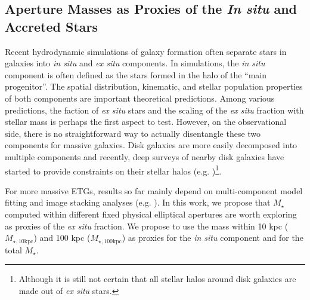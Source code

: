 \documentclass[a4paper,fleqn,usenatbib]{mnras}
\def\mstar{{$M_{\star}$}}
\def\minn{{$M_{\star,10\mathrm{kpc}}$}}
\def\mtot{{$M_{\star,100\mathrm{kpc}}$}}
\begin{document}
    

\subsection{Aperture Masses as Proxies of the \textit{In situ} and Accreted Stars}
    \label{ssec:insitu}
    
    Recent hydrodynamic simulations of galaxy formation often separate stars in 
    galaxies into \textit{in situ} and \textit{ex situ} components. 
    In simulations, the \textit{in situ} component is often defined as the stars 
    formed in the halo of the ``main progenitor''.  
    The spatial distribution, kinematic, and stellar population properties of both 
    components are important theoretical predictions. 
    Among various predictions, the faction of \textit{ex situ} stars and the scaling 
    of the \textit{ex situ} fraction with stellar mass is perhaps the first aspect to 
    test. 
    However, on the observational side, there is no straightforward way to actually
    disentangle these two components for massive galaxies. 
    Disk galaxies are more easily decomposed into multiple components and recently, 
    deep surveys of nearby disk galaxies have started to provide constraints on 
    their stellar halos (e.g. \citealt{Courteau2011, Merritt2016, 
    Harmsen2017})\footnote{Although it is still not certain that all stellar halos
    around disk galaxies are made out of \textit{ex situ} stars.}.
    
    For more massive ETGs, results so far mainly depend on multi-component model 
    fitting and image stacking analyses (e.g. \citealt{Huang2013a, DSouza2014,
    Spavone2017}).
    In this work, we propose that \mstar{} computed within different fixed physical
    elliptical apertures are worth exploring as proxies of the \textit{ex situ} 
    fraction. 
    We propose to use the mass within 10 kpc (\minn{}) and 100 kpc (\mtot{}) as 
    proxies for the \textit{in situ} component and for the total \mstar{}. 
    
\end{document}
